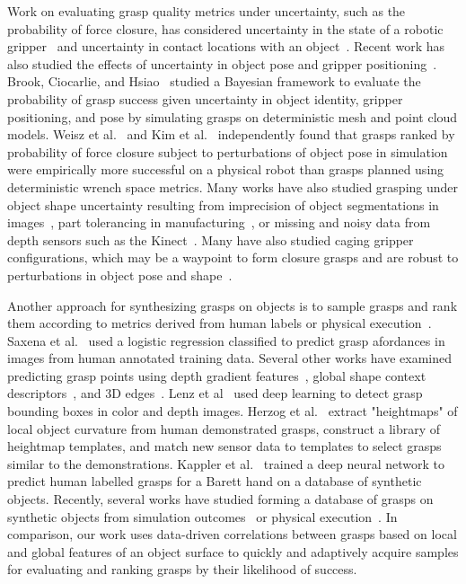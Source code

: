 Work on evaluating grasp quality metrics under uncertainty, such as the probability of force closure, has considered uncertainty in the state of a robotic gripper~\cite{goldberg1990bayesian, stulp2011learning} and uncertainty in contact locations with an object~\cite{zheng2005}.
Recent work has also studied the effects of uncertainty in object pose and gripper positioning~\cite{brook2011collaborative, hsiao2011bayesian}.
Brook, Ciocarlie, and Hsiao~\cite{brook2011collaborative, hsiao2011bayesian} studied a Bayesian framework to evaluate the probability of grasp success given uncertainty in object identity, gripper positioning, and pose by simulating grasps on deterministic mesh and point cloud models.
Weisz et al.~\cite{weisz2012pose} and Kim et al.~\cite{kim2012physically} independently found that grasps ranked by probability of force closure subject to perturbations of object pose in simulation were empirically more successful on a physical robot than grasps planned using deterministic wrench space metrics. 
Many works have also studied grasping under object shape uncertainty resulting from imprecision of object segmentations in images~\cite{chris}, part tolerancing in manufacturing~\cite{kehoe}, or missing and noisy data from depth sensors such as the Kinect~\cite{mahler, laskey}.
Many have also studied caging gripper configurations, which may be a waypoint to form closure grasps and are robust to perturbations in object pose and shape~\cite{}.

Another approach for synthesizing grasps on objects is to sample grasps and rank them according to metrics derived from human labels or physical execution~\cite{bohg}.
Saxena et al.~\cite{bothsaxenaworks} used a logistic regression classified to predict grasp afordances in images from human annotated training data.
Several other works have examined predicting grasp points using depth gradient features~\cite{rao}, global shape context descriptors~\cite{}, and 3D edges~\cite{}. 
Lenz et al~\cite{lenz} used deep learning to detect grasp bounding boxes in color and depth images.
Herzog et al.~\cite{} extract "heightmaps" of local object curvature from human demonstrated grasps, construct a library of heightmap templates, and match new sensor data to templates to select grasps similar to the demonstrations.
Kappler et al.~\cite{} trained a deep neural network to predict human labelled grasps for a Barett hand on a database of synthetic objects.
Recently, several works have studied forming a database of grasps on synthetic objects from simulation outcomes~\cite{detry} or physical execution~\cite{tellex}.
In comparison, our work uses data-driven correlations between grasps based on local and global features of an object surface to quickly and adaptively acquire samples for evaluating and ranking grasps by their likelihood of success.

